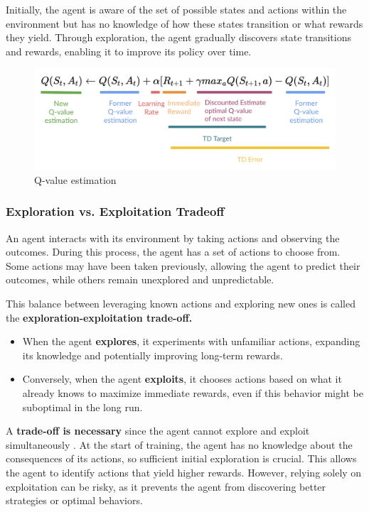 \documentclass{article}
\begin{document}
Initially, the agent is aware of the set of possible states and actions within the environment but has no knowledge of how these states transition or what rewards they yield. Through exploration, the agent gradually discovers state transitions and rewards, enabling it to improve its policy over time.

\begin{figure}[h]
	\centering
	\includegraphics[width=0.5\linewidth]{../data/images/Q-learning-8.png}
	\caption{Q-value estimation}
	\label{fig:q_learning}
\end{figure}

\subsubsection{Exploration vs. Exploitation Tradeoff}
An agent interacts with its environment by taking actions and observing the outcomes. During this process, the agent has a set of actions to choose from. Some actions may have been taken previously, allowing the agent to predict their outcomes, while others remain unexplored and unpredictable.

This balance between leveraging known actions and exploring new ones is called the \textbf{exploration-exploitation trade-off.}
\begin{itemize}
	\item When the agent \textbf{explores}, it experiments with unfamiliar actions, expanding its knowledge and potentially improving long-term rewards.
	\item Conversely, when the agent \textbf{exploits}, it chooses actions based on what it already knows to maximize immediate rewards, even if this behavior might be suboptimal in the long run.
\end{itemize}

A \textbf{trade-off is necessary} since the agent cannot explore and exploit simultaneously . At the start of training, the agent has no knowledge about the consequences of its actions, so sufficient initial exploration is crucial. This allows the agent to identify actions that yield higher rewards. However, relying solely on exploitation can be risky, as it prevents the agent from discovering better strategies or optimal behaviors.
\end{document}
